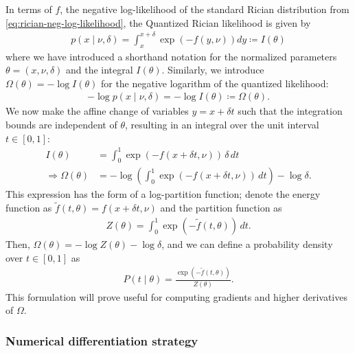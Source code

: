 \documentclass{article}
\begin{document}
In terms of $f$, the negative log-likelihood of the standard Rician distribution from \cref{eq:rician-neg-log-likelihood}, the Quantized Rician likelihood is given by
%
\begin{align}
  p(x \mid \nu, \delta) = \int_x^{x + \delta} \exp(-f(y, \nu)) dy \coloneqq I(\theta)
\end{align}
%
where we have introduced a shorthand notation for the normalized parameters $\theta = (x, \nu, \delta)$ and the integral $I(\theta)$.
Similarly, we introduce $\Omega(\theta) = -\log I(\theta)$ for the negative logarithm of the quantized likelihood:
%
\begin{align}
  -\log p(x \mid \nu, \delta) = -\log I(\theta) \coloneqq \Omega(\theta).
\end{align}
%
We now make the affine change of variables $y = x + \delta t$ such that the integration bounds are independent of $\theta$, resulting in an integral over the unit interval $t \in [0, 1]$:
%
\begin{align}
  I(\theta)                  & = \int_0^1 \exp(-f(x + \delta t, \nu)) \, \delta \, dt                       \\
  \Rightarrow \Omega(\theta) & = -\log\left(\int_0^1 \exp(-f(x + \delta t, \nu)) \, dt\right) - \log\delta.
\end{align}
%
This expression has the form of a log-partition function;
denote the energy function as $\tilde{f}(t, \theta) = f(x + \delta t, \nu)$ and the partition function as
%
\begin{align}
  Z(\theta) = \int_0^1 \exp(-\tilde{f}(t, \theta)) \, dt.
\end{align}
%
Then, $\Omega(\theta) = -\log Z(\theta) - \log\delta$, and we can define a probability density over $t \in [0,1]$ as
%
\begin{align}
  P(t \mid \theta) = \frac{\exp(-\tilde{f}(t, \theta))}{Z(\theta)}.
\end{align}
%
This formulation will prove useful for computing gradients and higher derivatives of $\Omega$.

\subsubsection{Numerical differentiation strategy}
\end{document}
